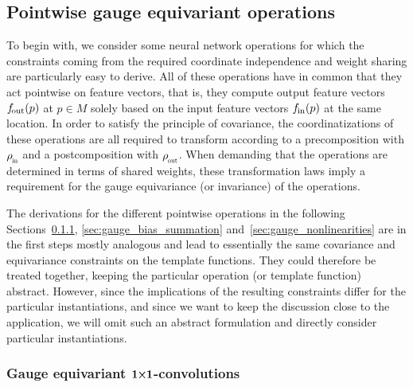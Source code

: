 

\subsection{Pointwise gauge equivariant operations}
\label{sec:pointwise_operations}


To begin with, we consider some neural network operations for which the constraints coming from the required coordinate independence and weight sharing are particularly easy to derive.
All of these operations have in common that they act pointwise on feature vectors, that is, they compute output feature vectors $f_\textup{\:\!\!out}(p)$ at $p\in M$ solely based on the input feature vectors $f_\textup{\;\!\!in}(p)$ at the same location.
In order to satisfy the principle of covariance, the coordinatizations of these operations are all required to transform according to a precomposition with $\rhoin$ and a postcomposition with $\rhoout$.
When demanding that the operations are determined in terms of shared weights, these transformation laws imply a requirement for the gauge equivariance (or invariance) of the operations.


The derivations for the different pointwise operations in the following Sections~\ref{sec:gauge_1x1}, \ref{sec:gauge_bias_summation} and~\ref{sec:gauge_nonlinearities} are in the first steps mostly analogous and lead to essentially the same covariance and equivariance constraints on the template functions.
They could therefore be treated together, keeping the particular operation (or template function) abstract.
However, since the implications of the resulting constraints differ for the particular instantiations, and since we want to keep the discussion close to the application, we will omit such an abstract formulation and directly consider particular instantiations.













\subsubsection[Gauge equivariant \texorpdfstring{\onexones}{1x1-convolutions}]%
              {Gauge equivariant ${\bf1\mkern-5.mu\boldsymbol{\times}\mkern-5.mu1}$-convolutions}
\label{sec:gauge_1x1}


